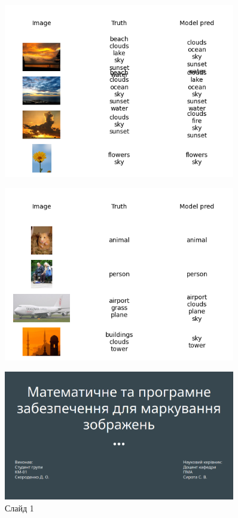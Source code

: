 \documentclass{udstu}
\begin{document}
\begin{figure}[!ht]
	\centering
	\includegraphics[width=0.9\textwidth]{PNG/showcase-375}
	\caption{}
\end{figure}

\begin{figure}[!ht]
	\centering
	\includegraphics[width=0.9\textwidth]{PNG/showcase-400}
	\caption{}
\end{figure}


\begin{figure}[!ht]
	\centering
	\includegraphics[width=0.9\textwidth]{PNG/present/present-1}
	\caption{Слайд 1}
\end{figure}
\end{document}
